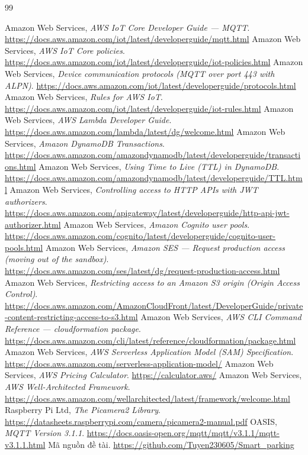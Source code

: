 \begin{thebibliography}{99}
\setlength{\itemsep}{2pt}
\small
{} Amazon Web Services, \emph{AWS IoT Core Developer Guide --- MQTT}. \url{https://docs.aws.amazon.com/iot/latest/developerguide/mqtt.html}
 Amazon Web Services, \emph{AWS IoT Core policies}. \url{https://docs.aws.amazon.com/iot/latest/developerguide/iot-policies.html}
 Amazon Web Services, \emph{Device communication protocols (MQTT over port 443 with ALPN)}. \url{https://docs.aws.amazon.com/iot/latest/developerguide/protocols.html}
 Amazon Web Services, \emph{Rules for AWS IoT}. \url{https://docs.aws.amazon.com/iot/latest/developerguide/iot-rules.html}
 Amazon Web Services, \emph{AWS Lambda Developer Guide}. \url{https://docs.aws.amazon.com/lambda/latest/dg/welcome.html}
 Amazon Web Services, \emph{Amazon DynamoDB Transactions}. \url{https://docs.aws.amazon.com/amazondynamodb/latest/developerguide/transactions.html}
 Amazon Web Services, \emph{Using Time to Live (TTL) in DynamoDB}. \url{https://docs.aws.amazon.com/amazondynamodb/latest/developerguide/TTL.html}
 Amazon Web Services, \emph{Controlling access to HTTP APIs with JWT authorizers}. \url{https://docs.aws.amazon.com/apigateway/latest/developerguide/http-api-jwt-authorizer.html}
 Amazon Web Services, \emph{Amazon Cognito user pools}. \url{https://docs.aws.amazon.com/cognito/latest/developerguide/cognito-user-pools.html}
 Amazon Web Services, \emph{Amazon SES --- Request production access (moving out of the sandbox)}. \url{https://docs.aws.amazon.com/ses/latest/dg/request-production-access.html}
 Amazon Web Services, \emph{Restricting access to an Amazon S3 origin (Origin Access Control)}. \url{https://docs.aws.amazon.com/AmazonCloudFront/latest/DeveloperGuide/private-content-restricting-access-to-s3.html}
 Amazon Web Services, \emph{AWS CLI Command Reference --- cloudformation package}. \url{https://docs.aws.amazon.com/cli/latest/reference/cloudformation/package.html}
 Amazon Web Services, \emph{AWS Serverless Application Model (SAM) Specification}. \url{https://docs.aws.amazon.com/serverless-application-model/}
 Amazon Web Services, \emph{AWS Pricing Calculator}. \url{https://calculator.aws/}
 Amazon Web Services, \emph{AWS Well-Architected Framework}. \url{https://docs.aws.amazon.com/wellarchitected/latest/framework/welcome.html}
 Raspberry Pi Ltd, \emph{The Picamera2 Library}. \url{https://datasheets.raspberrypi.com/camera/picamera2-manual.pdf}
 OASIS, \emph{MQTT Version 3.1.1}. \url{https://docs.oasis-open.org/mqtt/mqtt/v3.1.1/mqtt-v3.1.1.html}
 Mã nguồn đề tài. \url{https://github.com/Tuyen230605/Smart_parking}
\end{thebibliography}

